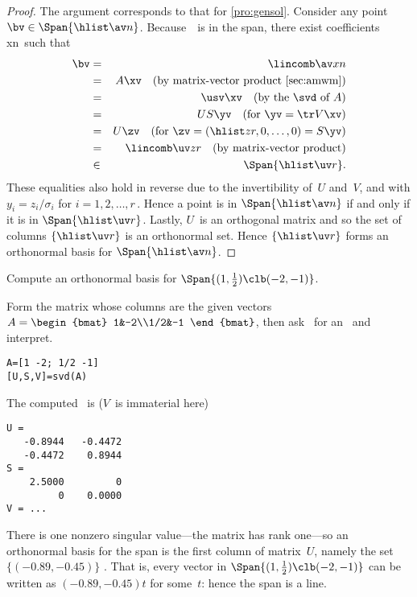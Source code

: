\begin{proof} 
The argument corresponds to that for \cref{pro:gensol}.
Consider any point \(\bv\in\Span\{\hlist\av n\}\).
Because~\bv\ is in the span, there exist coefficients \hlist xn\ such that
\begin{eqnarray*}
\bv&=&\lincomb \av xn
\\&=&A\xv \quad(\text{by matrix-vector product \cref{sec:amwm}})
\\&=&\usv \xv \quad(\text{by the \svd\ of }A)
\\&=&US \yv \quad(\text{for }\yv=\tr V\xv)
\\&=&U\zv \quad(\text{for }\zv=(\hlist zr,0,\ldots,0)=S\yv)
\\&=&\lincomb \uv z r  \quad(\text{by matrix-vector product})
\\&\in&\Span\{\hlist \uv r\}.
\end{eqnarray*}
These equalities also hold in reverse due to the invertibility of~\(U\) and~\(V\), and with \(y_i=z_i/\sigma_i\) for \(i=1,2,\ldots,r\)\,.
Hence a point is in \(\Span\{\hlist\av n\}\) if and only if it is in \(\Span\{\hlist \uv r\}\).
Lastly, \(U\)~is an orthogonal matrix and so the set of columns \(\{\hlist \uv r\}\) is an orthonormal set.
Hence \(\{\hlist \uv r\}\) forms an orthonormal basis for \(\Span\{\hlist\av n\}\).
\end{proof}


\begin{example} \label{eg:orthspn2}
Compute an orthonormal basis for \(\Span\{(1,\frac12)\clb(-2,-1)\}\).
\begin{solution} 
Form the matrix whose columns are the given vectors
\(A=\begin{bmat} 1&-2\\1/2&-1 \end{bmat}\),
then ask \script\ for an \svd\ and interpret.
\begin{verbatim}
A=[1 -2; 1/2 -1]
[U,S,V]=svd(A)
\end{verbatim}
\setbox\ajrqrbox\hbox{}%
\marginajrbox%
The computed \svd\ is (\(V\)~is immaterial here)
\begin{verbatim}
U =
   -0.8944   -0.4472
   -0.4472    0.8944
S =
    2.5000         0
         0    0.0000
V = ...
\end{verbatim}
There is one nonzero singular value---the matrix has rank one---so an orthonormal basis for the span is the first column of matrix~\(U\), namely the set \(\{(-0.89,-0.45)\}\) \twodp.
That is, every vector in \(\Span\{(1,\frac12)\clb (-2,-1)\}\) can be written as \((-0.89,-0.45)t\) for some~\(t\): hence the span is a line.
\end{solution}
\end{example}


